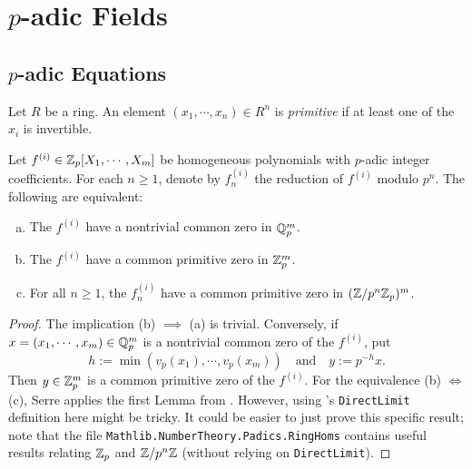 \chapter[p-adic Fields]{$p$-adic Fields}

\section[p-adic Equations]{$p$-adic Equations}\label{sec:padic_equations}

\begin{definition}\label{def:primitive}
\leanok
Let $R$ be a ring. An element $(x_1, \cdots, x_n) \in R^n$ is \emph{primitive} if at least one of the $x_i$ is invertible.
\end{definition}


\begin{proposition}\label{prop:common_root}
\leanok
{}
Let $f^{(i)} \in \mathbb{Z}_p[X_1, \cdots, X_m]$ be homogeneous polynomials with $p$-adic integer coefficients. For each $n \ge 1$, denote by $f_n^{(i)}$ the reduction of $f^{(i)}$ modulo $p^n$.
 The following are equivalent:
\begin{enumerate}[a)]
\leanok
\item The $f^{(i)}$ have a nontrivial common zero in $\mathbb{Q}_p^m$.
\item The $f^{(i)}$ have a common primitive zero in $\mathbb{Z}_p^m$.
\item For all $n \ge 1$, the $f_n^{(i)}$ have a common primitive zero in $(\mathbb{Z} / p^n \mathbb{Z}_p)^m$.
\end{enumerate}
\end{proposition}

\begin{proof}
The implication (b) $ \implies$ (a) is trivial. Conversely, if $x = (x_1, \cdots, x_m) \in \mathbb{Q}_p^m$ is a nontrivial common zero of the $f^{(i)}$, put
\[ h := \min(v_p(x_1), \cdots, v_p(x_m)) \quad \text{and} \quad y := p^{-h} x. \]
Then $y \in \mathbb{Z}_p^m$ is a common primitive zero of the $f^{(i)}$.
For the equivalence (b) $\iff$ (c), Serre applies the first Lemma from \cite[\S II.2.1]{Ser73}. However, using \mathlib's \texttt{DirectLimit} definition here might be tricky. It could be easier to just prove this specific result; note that the file \texttt{Mathlib.NumberTheory.Padics.RingHoms} contains useful results relating $\mathbb{Z}_p$ and $\mathbb{Z}/p^n\mathbb{Z}$ (without relying on \texttt{DirectLimit}).

\end{proof}

